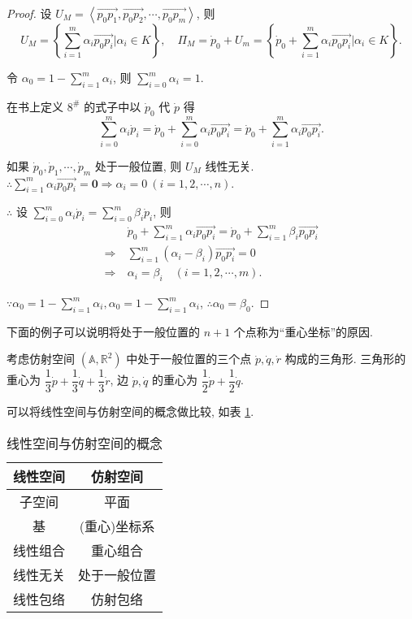 \documentclass[color=black,device=normal,lang=cn,mode=geye]{elegantnote}
\begin{document}
\begin{proof}
    设 $U_M=\left<\overrightarrow{p_0p_1},\overrightarrow{p_0p_2},\cdots,\overrightarrow{p_0p_m}\right>$, 则
    \[U_M=\left\{\sum\limits_{i=1}^m\alpha_i\overrightarrow{p_0p_i}\bigg|\alpha_i\in K\right\},\quad\varPi_M=\dot{p}_0+U_m=\left\{\dot{p}_0+\sum\limits_{i=1}^m\alpha_i\overrightarrow{p_0p_i}\bigg|\alpha_i\in K\right\}.\]
    
    令 $\alpha_0=1-\sum\limits_{i=1}^m\alpha_i$, 则 $\sum\limits_{i=0}^m\alpha_i=1$.

    在书上定义 $8^\#$ 的式子中以 $\dot{p}_0$ 代 $\dot{p}$ 得
    \[\sum\limits_{i=0}^m\alpha_i\dot{p}_i=\dot{p}_0+\sum\limits_{i=0}^m\alpha_i\overrightarrow{p_0p_i}=\dot{p}_0+\sum\limits_{i=1}^m\alpha_i\overrightarrow{p_0p_i}.\]

    如果 $\dot{p}_0,\dot{p}_1,\cdots,\dot{p}_m$ 处于一般位置, 则 $U_M$ 线性无关. $\therefore\sum\limits_{i=1}^m\alpha_i\overrightarrow{p_0p_i}=\boldsymbol{0}\Rightarrow\alpha_i=0\ (i=1,2,\cdots,n)$.

    $\therefore$ 设 $\sum\limits_{i=0}^m\alpha_i\dot{p}_i=\sum\limits_{i=0}^m\beta_i\dot{p}_i$, 则
    \begin{align*}
        & \dot{p}_0+\sum\limits_{i=1}^m\alpha_i\overrightarrow{p_0p_i}=\dot{p}_0+\sum\limits_{i=1}^m\beta_i\overrightarrow{p_0p_i} \\
        \Rightarrow\ & \sum\limits_{i=1}^m(\alpha_i-\beta_i)\overrightarrow{p_0p_i}=0 \\
        \Rightarrow\ & \alpha_i=\beta_i\quad(i=1,2,\cdots,m).
    \end{align*}

    $\because\alpha_0=1-\sum\limits_{i=1}^m\alpha_i,\alpha_0=1-\sum\limits_{i=1}^m\alpha_i$, $\therefore\alpha_0=\beta_0$.
\end{proof}
下面的例子可以说明将处于一般位置的 $n+1$ 个点称为``重心坐标''的原因.
\begin{example}
    考虑仿射空间 $(\mathbb{A},\mathbb{R}^2)$ 中处于一般位置的三个点 $\dot{p},\dot{q},\dot{r}$ 构成的三角形. 三角形的重心为 $\dfrac{1}{3}\dot{p}+\dfrac{1}{3}\dot{q}+\dfrac{1}{3}\dot{r}$, 边 $\dot{p},\dot{q}$ 的重心为 $\dfrac{1}{2}\dot{p}+\dfrac{1}{2}\dot{q}$.
\end{example}
可以将线性空间与仿射空间的概念做比较, 如表 \ref{tb1}.
\begin{table}\caption{线性空间与仿射空间的概念}\label{tb1}
    \begin{center}
        \begin{tabular}{c|c}
            线性空间 & 仿射空间 \\
            \hline
            子空间 & 平面 \\
            基 & (重心)坐标系 \\
            线性组合 & 重心组合 \\
            线性无关 & 处于一般位置 \\
            线性包络 & 仿射包络 \\
        \end{tabular}
    \end{center}
\end{table}
\end{document}
